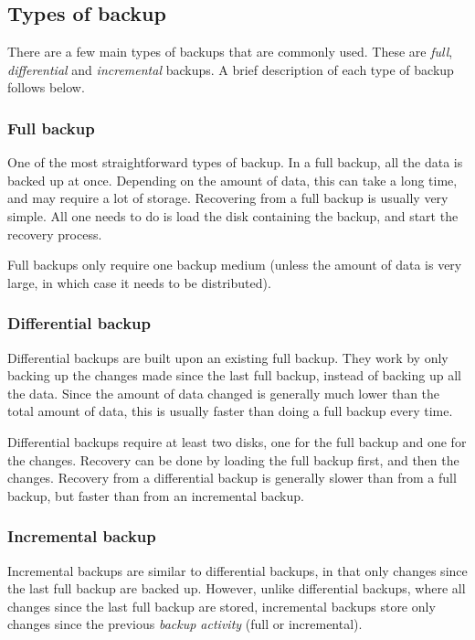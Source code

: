 \subsection{Types of backup} \label{Backup Strategies}
There are a few main types of backups that are commonly used.
These are \emph{full}, \emph{differential} and \emph{incremental} backups.
A brief description of each type of backup follows below.

\subsubsection{Full backup}

One of the most straightforward types of backup.
In a full backup, all the data is backed up at once.
Depending on the amount of data, this can take a long time,
and may require a lot of storage.
Recovering from a full backup is usually very simple.
All one needs to do is load the disk containing the backup,
and start the recovery process.

Full backups only require one backup medium 
(unless the amount of data is very large, in which case it needs to be distributed).

\subsubsection{Differential backup}

Differential backups are built upon an existing full backup.
They work by only backing up the changes made since the last full backup, 
instead of backing up all the data.
Since the amount of data changed is generally much lower than the total amount of data,
this is usually faster than doing a full backup every time.

Differential backups require at least two disks, one for the full backup and one for the changes.
Recovery can be done by loading the full backup first, and then the changes.
Recovery from a differential backup is generally slower than from a full backup, but faster than from an incremental backup.

\subsubsection{Incremental backup}

Incremental backups are similar to differential backups,
in that only changes since the last full backup are backed up.
However, unlike differential backups, where all changes since the last full backup are stored,
incremental backups store only changes since the previous \emph{backup activity} (full or incremental).

